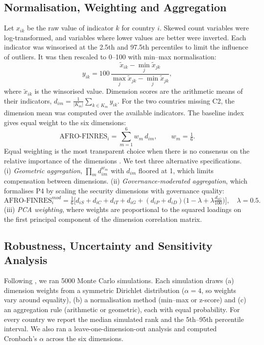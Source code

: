 \documentclass[11pt,a4paper]{article}
\begin{document}
\subsection{Normalisation, Weighting and Aggregation}

Let $x_{ik}$ be the raw value of indicator $k$ for country $i$. Skewed count variables were log-transformed, and variables where lower values are better were inverted. Each indicator was winsorised at the 2.5th and 97.5th percentiles to limit the influence of outliers. It was then rescaled to 0--100 with min--max normalisation:
\begin{equation}
 y_{ik}=100\,\frac{\tilde{x}_{ik}-\min_j \tilde{x}_{jk}}{\max_j \tilde{x}_{jk}-\min_j \tilde{x}_{jk}},
\end{equation}
where $\tilde{x}_{ik}$ is the winsorised value. Dimension scores are the arithmetic means of their indicators, $d_{im}=\frac{1}{|K_m|}\sum_{k\in K_m} y_{ik}$. For the two countries missing C2, the dimension mean was computed over the available indicators. The baseline index gives equal weight to the six dimensions:
\begin{equation}
 \text{AFRO-FINRES}_i=\sum_{m=1}^{6} w_m\, d_{im},\qquad w_m=\tfrac{1}{6}.
\end{equation}
Equal weighting is the most transparent choice when there is no consensus on the relative importance of the dimensions \citep{OECD2008,Greco2018}. We test three alternative specifications. (i) \emph{Geometric aggregation}, $\prod_m d_{im}^{w_m}$ with $d_{im}$ floored at 1, which limits compensation between dimensions. (ii) \emph{Governance-moderated aggregation}, which formalises P4 by scaling the security dimensions with governance quality:
\begin{equation}
 \text{AFRO-FINRES}^{mod}_i=\tfrac{1}{6}\Big[d_{iS}+d_{iC}+d_{iT}+d_{iG}+(d_{iP}+d_{iD})\big(1-\lambda+\lambda\tfrac{d_{iG}}{100}\big)\Big],\quad \lambda=0.5.
\end{equation}
(iii) \emph{PCA weighting}, where weights are proportional to the squared loadings on the first principal component of the dimension correlation matrix.

\subsection{Robustness, Uncertainty and Sensitivity Analysis}

Following \citet{Saisana2005}, we ran 5000 Monte Carlo simulations. Each simulation draws (a) dimension weights from a symmetric Dirichlet distribution ($\alpha=4$, so weights vary around equality), (b) a normalisation method (min--max or z-score) and (c) an aggregation rule (arithmetic or geometric), each with equal probability. For every country we report the median simulated rank and the 5th--95th percentile interval. We also ran a leave-one-dimension-out analysis and computed Cronbach's $\alpha$ across the six dimensions.
\end{document}
